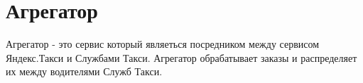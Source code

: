 \chapter{Агрегатор} \label{aggregator}

	Агрегатор - это сервис который являеться посредником между сервисом Яндекс.Такси и Службами Такси. Агрегатор обрабатывает заказы и распределяет их между водителями Служб Такси.

	
	